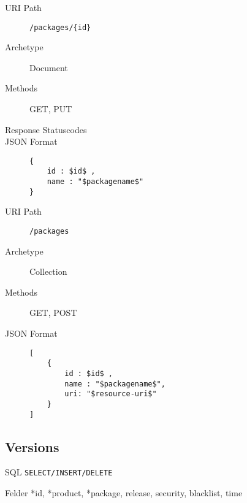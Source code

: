 \documentclass[10pt,a4paper]{scrartcl}
\begin{document}
\begin{mdframed}[style=def]
\begin{description}
	\item[URI Path] \texttt{/packages/\{id\}}
	\item[Archetype] Document
	\item[Methods] GET, PUT
	\item[Response Statuscodes] \hfill
	\item[JSON Format] \hfill
\begin{lstlisting}
{
	id : $id$ ,
	name : "$packagename$"
}
\end{lstlisting}
\end{description}
\end{mdframed}

\begin{mdframed}[style=def]
\begin{description}
	\item[URI Path] \texttt{/packages}
	\item[Archetype] Collection
	\item[Methods] GET, POST
	\item[JSON Format] \hfill
\begin{lstlisting}
[
	{
		id : $id$ ,
		name : "$packagename$",
		uri: "$resource-uri$"
	}
]
\end{lstlisting}
\end{description}
\end{mdframed}


\pagebreak
\subsection{Versions}

\begin{description*}
    \item[SQL] \texttt{SELECT/INSERT/DELETE}
    \item[Felder] *id, *product, *package, release, security, blacklist, time
\end{description*}
\end{document}
